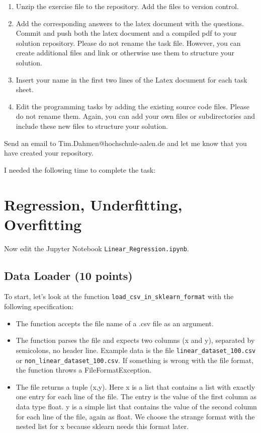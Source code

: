 \begin{enumerate}
\item Unzip the exercise file to the repository. Add the files to version control.  
\item Add the corresponding answers to the latex document with the questions. Commit and push both the latex document and a compiled pdf to your solution repository. Please do not rename the task file. However, you can create additional files and link or otherwise use them to structure your solution. 
\item Insert your name in the first two lines of the Latex document for each task sheet.
\item Edit the programming tasks by adding the existing source code files. Please do not rename them. Again, you can add your own files or subdirectories and include these new files to structure your solution. 
\end{enumerate}

Send an email to Tim.Dahmen@hochschule-aalen.de and let me know that you have created your repository. 

I needed the following time to complete the task:

\section{Regression, Underfitting, Overfitting}

Now edit the Jupyter Notebook \texttt{Linear\_Regression.ipynb}.

\subsection{Data Loader (10 points)}

To start, let's look at the function \texttt{load\_csv\_in\_sklearn\_format} with the following specification:

\begin{itemize}
\item The function accepts the file name of a .csv file as an argument.
\item The function parses the file and expects two columns (x and y), separated by semicolons, no header line. Example data is the file \texttt{linear\_dataset\_100.csv} or \texttt{non\_linear\_dataset\_100.csv}. If something is wrong with the file format, the function throws a FileFormatException.
\item The file returns a tuple (x,y). Here x is a list that contains a list with exactly one entry for each line of the file. The entry is the value of the first column as data type float. y is a simple list that contains the value of the second column for each line of the file, again as float. We choose the strange format with the nested list for x because sklearn needs this format later.
\end{itemize}

